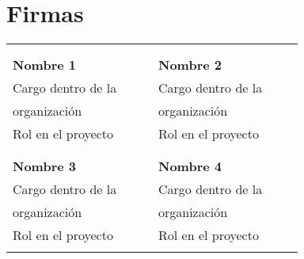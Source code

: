 \section{Firmas}
\centering
\noindent\begin{tabular}{@{}C{0.4\linewidth}C{0.4\linewidth}@{}}
                                 & \\[8ex]
\dotfill                         & \dotfill\\
\textbf{Nombre 1}                & \textbf{Nombre 2} \\
Cargo dentro de la               & Cargo dentro de la  \\
organización                     & organización \\
Rol en el proyecto               & Rol en el proyecto \\
                                 & \\[8ex]
\dotfill                         & \dotfill\\
\textbf{Nombre 3}                & \textbf{Nombre 4} \\
Cargo dentro de la               & Cargo dentro de la  \\
organización                     & organización \\
Rol en el proyecto               & Rol en el proyecto \\
                                 & \\[8ex]
\end{tabular}


